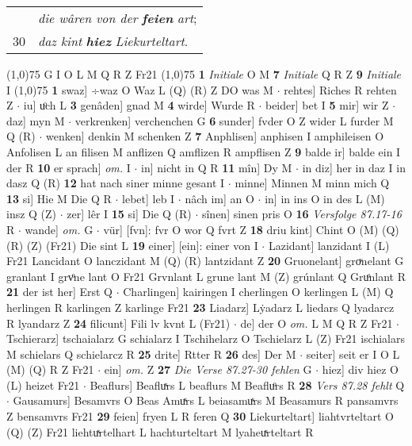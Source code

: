 \documentclass[8pt,a4paper,notitlepage]{article}
\begin{document}
\begin{table}[ht]
\begin{minipage}[t]{0.5\linewidth}
\begin{tabular}{rl}
 & \textit{die wâren von der} \textit{\textbf{feien}} \textit{art};\\ 
30 & \textit{daz kint} \textit{\textbf{hiez}} \textit{Liekurteltart}.\\ 
\end{tabular}
\scriptsize
\line(1,0){75} \newline
G I O L M Q R Z Fr21 \newline
\line(1,0){75} \newline
\textbf{1} \textit{Initiale} O M  \textbf{7} \textit{Initiale} Q R Z  \textbf{9} \textit{Initiale} I  \newline
\line(1,0){75} \newline
\textbf{1} swaz] ÷waz O Waz L (Q) (R) Z DO was M  $\cdot$ rehtes] Riches R rehten Z  $\cdot$ iu] uͦch L \textbf{3} genâden] gnad M \textbf{4} wirde] Wurde R  $\cdot$ beider] bet I \textbf{5} mir] wir Z  $\cdot$ daz] myn M  $\cdot$ verkrenken] verchenchen G \textbf{6} sunder] fvder O Z wider L furder M Q (R)  $\cdot$ wenken] denkin M schenken Z \textbf{7} Anphlisen] anphisen I amphileisen O Anfolisen L an filisen M anflizen Q amflizen R ampflisen Z \textbf{9} balde ir] balde ein I der R \textbf{10} er sprach] \textit{om.} I  $\cdot$ in] nicht in Q R \textbf{11} mîn] Dy M  $\cdot$ in diz] her in daz I in dasz Q (R) \textbf{12} hat nach siner minne gesant I  $\cdot$ minne] Minnen M minn mich Q \textbf{13} si] Hie M Die Q R  $\cdot$ lebet] leb I  $\cdot$ nâch im] an O  $\cdot$ in] in ins O in des L (M) insz Q (Z)  $\cdot$ zer] lêr I \textbf{15} si] Die Q (R)  $\cdot$ sînen] sinen pris O \textbf{16} \textit{Versfolge 87.17-16} R   $\cdot$ wande] \textit{om.} G  $\cdot$ vür] [fvn]: fvr O wor Q fvrt Z \textbf{18} driu kint] Chint O (M) (Q) (R) (Z) (Fr21) Die sint L \textbf{19} einer] [ein]: einer von I  $\cdot$ Lazidant] lanzidant I (L) Fr21 Lancidant O lanczidant M (Q) (R) lantzidant Z \textbf{20} Gruonelant] groͮnelant G granlant I grvͦne lant O Fr21 Grvnlant L grune lant M (Z) grúnlant Q Gruͦnlant R \textbf{21} der ist her] Erst Q  $\cdot$ Charlingen] kairingen I cherlingen O kerlingen L (M) Q herlingen R karlingen Z karlinge Fr21 \textbf{23} Liadarz] Lẏadarz L liedars Q lyadarcz R lyandarz Z \textbf{24} filicunt] Fili lv kvnt L (Fr21)  $\cdot$ de] der O \textit{om.} L M Q R Z Fr21  $\cdot$ Tschierarz] tschaialarz G schialarz I Tschihelarz O Tschielarz L (Z) Fr21 ischialars M schielars Q schielarcz R \textbf{25} drite] Rtter R \textbf{26} des] Der M  $\cdot$ seiter] seit er I O L (M) (Q) R Z Fr21  $\cdot$ ein] \textit{om.} Z \textbf{27} \textit{Die Verse 87.27-30 fehlen} G   $\cdot$ hiez] div hiez O (L) heizet Fr21  $\cdot$ Beaflurs] Beafluͯrs L beaflurs M Beafluͦrs R \textbf{28} \textit{Vers 87.28 fehlt} Q   $\cdot$ Gausamurs] Besamvrs O Beas Amuͯrs L beiasamuͯrs M Beasamurs R pansamvrs Z bensamvrs Fr21 \textbf{29} feien] fryen L R feren Q \textbf{30} Liekurteltart] liahtvrteltart O (Q) (Z) Fr21 liehtuͯrtelhart L hachturteltart M lyaheuͯrteltart R \newline

\end{minipage}
\end{table}
\end{document}
